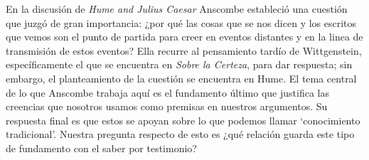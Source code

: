 \label{subsec:testtrad}
En la discusión de \emph{Hume and Julius Caesar} Anscombe estableció una cuestión que juzgó de gran importancia: ¿por qué las cosas que se nos dicen y los escritos que vemos son el punto de partida para creer en eventos distantes y en la linea de transmisión de estos eventos? Ella recurre al pensamiento tardío de Wittgenstein, específicamente el que se encuentra en \emph{Sobre la Certeza}, para dar respuesta; sin embargo, el planteamiento de la cuestión se encuentra en Hume. El tema central de lo que Anscombe trabaja aquí es el fundamento último que justifica las creencias que nosotros usamos como premisas en nuestros argumentos. Su respuesta final es que estos se apoyan sobre lo que podemos llamar `conocimiento tradicional'. Nuestra pregunta respecto de esto es ¿qué relación guarda este tipo de fundamento con el saber por testimonio?

